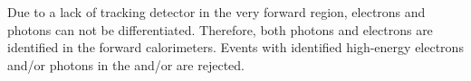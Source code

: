 Due to a lack of tracking detector in the very forward region, electrons and photons can not be differentiated. Therefore, both photons and electrons are identified in the forward calorimeters. Events with identified high-energy electrons and/or photons in the \BeamCAL and/or \LumiCAL are rejected.


